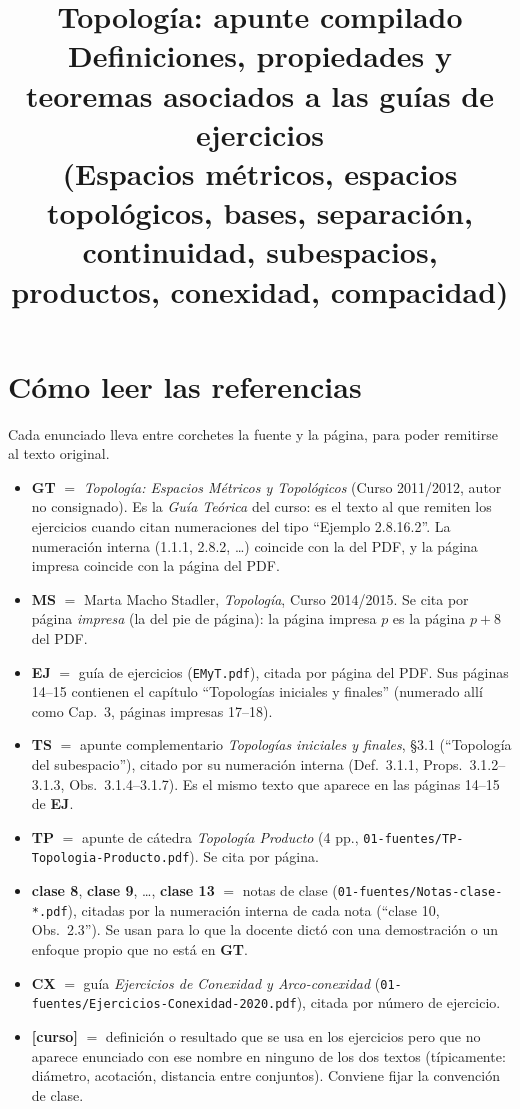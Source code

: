 \documentclass[11pt,a4paper]{article}
\title{\textbf{Topología: apunte compilado}\\[2pt]
\large Definiciones, propiedades y teoremas asociados a las guías de ejercicios\\
\normalsize (Espacios métricos, espacios topológicos, bases, separación, continuidad, subespacios, productos, conexidad, compacidad)}
\author{}
\date{}
\theoremstyle{definition}
\theoremstyle{plain}
\begin{document}
\maketitle
\vspace{-2.2em}

\section*{Cómo leer las referencias}
Cada enunciado lleva entre corchetes la fuente y la página, para poder remitirse al texto original.

\begin{itemize}[leftmargin=1.6em,itemsep=1pt]
\item \textbf{GT} $=$ \emph{Topología: Espacios Métricos y Topológicos} (Curso 2011/2012, autor no consignado). Es la \emph{Guía Teórica} del curso: es el texto al que remiten los ejercicios cuando citan numeraciones del tipo ``Ejemplo 2.8.16.2''. La numeración interna (1.1.1, 2.8.2, \dots) coincide con la del PDF, y la página impresa coincide con la página del PDF.
\item \textbf{MS} $=$ Marta Macho Stadler, \emph{Topología}, Curso 2014/2015. Se cita por página \emph{impresa} (la del pie de página): la página impresa $p$ es la página $p+8$ del PDF.
\item \textbf{EJ} $=$ guía de ejercicios (\texttt{EMyT.pdf}), citada por página del PDF. Sus páginas 14--15 contienen el capítulo ``Topologías iniciales y finales'' (numerado allí como Cap.~3, páginas impresas 17--18).
\item \textbf{TS} $=$ apunte complementario \emph{Topologías iniciales y finales}, \S3.1 (``Topología del subespacio''), citado por su numeración interna (Def.\ 3.1.1, Props.\ 3.1.2--3.1.3, Obs.\ 3.1.4--3.1.7). Es el mismo texto que aparece en las páginas 14--15 de \textbf{EJ}.
\item \textbf{TP} $=$ apunte de cátedra \emph{Topología Producto} (4 pp., \texttt{01-fuentes/TP-Topologia-Producto.pdf}). Se cita por página.
\item \textbf{clase 8}, \textbf{clase 9}, \dots, \textbf{clase 13} $=$ notas de clase (\texttt{01-fuentes/Notas-clase-*.pdf}), citadas por la numeración interna de cada nota (``clase 10, Obs.\ 2.3''). Se usan para lo que la docente dictó con una demostración o un enfoque propio que no está en \textbf{GT}.
\item \textbf{CX} $=$ guía \emph{Ejercicios de Conexidad y Arco-conexidad} (\texttt{01-fuentes/Ejercicios-Conexidad-2020.pdf}), citada por número de ejercicio.
\item \textbf{[curso]} $=$ definición o resultado que se usa en los ejercicios pero que no aparece enunciado con ese nombre en ninguno de los dos textos (típicamente: diámetro, acotación, distancia entre conjuntos). Conviene fijar la convención de clase.
\end{itemize}
\end{document}

